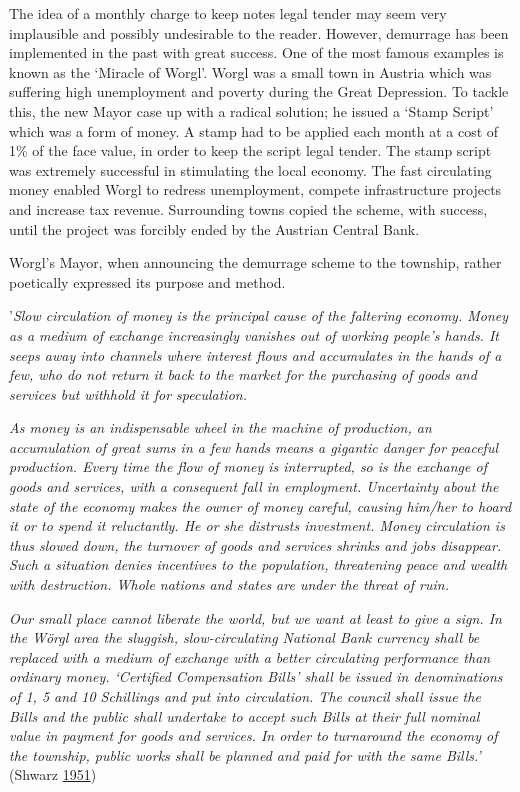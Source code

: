 \documentclass[]{tufte-handout}
\begin{document}
The idea of a monthly charge to keep notes legal tender may seem very
implausible and possibly undesirable to the reader. However, demurrage
has been implemented in the past with great success. One of the most
famous examples is known as the `Miracle of Worgl'. Worgl was a small
town in Austria which was suffering high unemployment and poverty during
the Great Depression. To tackle this, the new Mayor case up with a
radical solution; he issued a `Stamp Script' which was a form of money.
A stamp had to be applied each month at a cost of 1\% of the face value,
in order to keep the script legal tender. The stamp script was extremely
successful in stimulating the local economy. The fast circulating money
enabled Worgl to redress unemployment, compete infrastructure projects
and increase tax revenue. Surrounding towns copied the scheme, with
success, until the project was forcibly ended by the Austrian Central
Bank.

Worgl's Mayor, when announcing the demurrage scheme to the township,
rather poetically expressed its purpose and method.

'\emph{Slow circulation of money is the principal cause of the faltering
economy. Money as a medium of exchange increasingly vanishes out of
working people's hands. It seeps away into channels where interest flows
and accumulates in the hands of a few, who do not return it back to the
market for the purchasing of goods and services but withhold it for
speculation.}

\emph{As money is an indispensable wheel in the machine of production,
an accumulation of great sums in a few hands means a gigantic danger for
peaceful production. Every time the flow of money is interrupted, so is
the exchange of goods and services, with a consequent fall in
employment. Uncertainty about the state of the economy makes the owner
of money careful, causing him/her to hoard it or to spend it
reluctantly. He or she distrusts investment. Money circulation is thus
slowed down, the turnover of goods and services shrinks and jobs
disappear. Such a situation denies incentives to the population,
threatening peace and wealth with destruction. Whole nations and states
are under the threat of ruin.}

\emph{Our small place cannot liberate the world, but we want at least to
give a sign. In the Wörgl area the sluggish, slow-circulating National
Bank currency shall be replaced with a medium of exchange with a better
circulating performance than ordinary money. `Certified Compensation
Bills' shall be issued in denominations of 1, 5 and 10 Schillings and
put into circulation. The council shall issue the Bills and the public
shall undertake to accept such Bills at their full nominal value in
payment for goods and services. In order to turnaround the economy of
the township, public works shall be planned and paid for with the same
Bills.'} (Shwarz \protect\hyperlink{ref-Shwarz1951}{1951})
\end{document}
